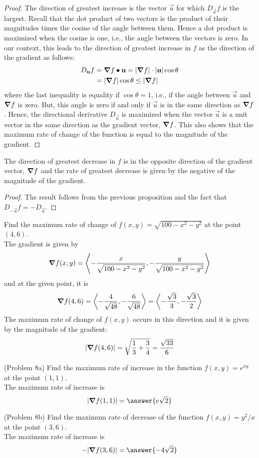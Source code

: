 \documentclass[handout]{ximera}
\begin{document}
\begin{proof}
The direction of greatest increase is the vector $\vec u$ for which $D_{\vec u}f$ is the largest. 
Recall that the dot product of two vectors is the product of their magnitudes times the cosine of the angle between them.  
Hence a dot product is maximized when the cosine is one, i.e., the angle between the vectors is zero.  
In our context, this leads to the direction of greatest
increase in $f$ as the direction of the gradient as follows:
\begin{align*}
D_{\mathbf u} f &= \boldsymbol\nabla f \bullet \mathbf u = |\boldsymbol\nabla f| \cdot |\mathbf u| \cos \theta\\
             &= |\boldsymbol\nabla f| \cos \theta \leq |\boldsymbol\nabla f|
\end{align*}
where the last inequality is equality if $\cos \theta = 1$, i.e., if the angle between $\vec u$ and $\boldsymbol\nabla f$ is zero.
But, this angle is zero if and only if $\vec u$ is in the same direction as $\boldsymbol\nabla f$.  Hence, the directional derivative
$D_{\vec u}$ is maximized when the vector $\vec u$ is a unit vector in the same direction as the gradient vector, $\boldsymbol\nabla f$.
This also shows that the maximum rate of change of the function is equal to the magnitude of the gradient.
\end{proof}

\begin{corollary}
The direction of greatest decrease in $f$ is in the opposite direction of the gradient vector, $\boldsymbol\nabla f$ and the rate of greatest decrease is given by
the negative of the magnitude of the gradient.
\end{corollary}
\begin{proof}
The result follows from the previous proposition and the fact that $D_{-\vec u} f = -D_{\vec u}$.
\end{proof}

\begin{example}[Example 8]
Find the maximum rate of change of $f(x,y) = \sqrt{100 - x^2 - y^2}$ at the point $(4, 6)$.\\
The gradient is given by
\[
\boldsymbol\nabla f(x,y) = \left\langle -\frac{x}{\sqrt{100 - x^2 - y^2}}, -\frac{y}{\sqrt{100 - x^2 - y^2}}\right\rangle
\]
and at the given point, it is
\[
\boldsymbol\nabla f(4,6) = \left\langle -\frac{4}{\sqrt{48}}, -\frac{6}{\sqrt{48}}\right\rangle = \left\langle -\frac{\sqrt 3}{3}, -\frac{\sqrt 3}{2}\right\rangle
\]
The maximum rate of change of $f(x,y)$ occurs in this direction and it is given by the magnitude of the gradient:
\[
|\boldsymbol\nabla f(4,6)| = \sqrt{\frac13 + \frac34} = \frac{\sqrt{33}}{6}
\]
\end{example}

\begin{problem}(Problem 8a)
Find the maximum rate of increase in the function $f(x,y) = e^{xy}$ at the point $(1, 1)$.\\
The maximum rate of increase is 
\[
|\grad f(1, 1)| = \answer{e\sqrt 2}
\]
\end{problem}

\begin{problem}(Problem 8b)
Find the maximum rate of decrease of the function $f(x,y) = y^2/x$ at the point $(3, 6)$.\\
The maximum rate of increase is 
\[
-|\grad f(3, 6)| = \answer{-4\sqrt 2}
\]
\end{problem}
\end{document}
